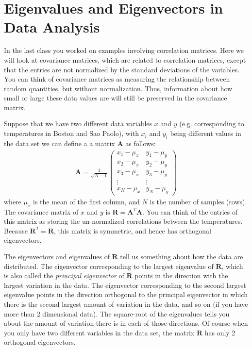 
\section{Eigenvalues and Eigenvectors in Data Analysis}

In the last class you worked on examples involving correlation matrices. Here we will look at covariance matrices, which are related to correlation matrices, except that the entries are not normalized by the standard deviations of the variables. You can think of covariance matrices as measuring the relationship between random quantities, but without normalization. Thus, information about how small or large these data values are will still be preserved in the covariance matrix.

Suppose that  we have two different data variables $x$ and $y$ (e.g. corresponding to temperatures in Boston and Sao Paolo), with $x_i$ and $y_i$ being different values in the data set we can define a a matrix $\mathbf{A}$ as follows:
\begin{align*}
\mathbf{A} = \frac{1}{\sqrt{N-1}} \begin{pmatrix}
    {x_1-\mu_x} & {y_1-\mu_y}\\
   {x_2-\mu_x} &  {y_2-\mu_y}\\
    {x_3-\mu_x} & {y_3-\mu_y}\\
    \vdots & \vdots \\
    x_N - \mu_x & y_N - \mu_y
  \end{pmatrix}
\end{align*}
where $\mu_x$ is the mean  of the first column, and $N$ is the number of samples (rows).  The covariance matrix of $x$ and $y$ is $\mathbf{R} = \mathbf{A}^T \mathbf{A}$. You can think of the entries of this matrix as storing the un-normalized correlations between the temperatures. Because $\mathbf{R}^T = \mathbf{R}$, this matrix is symmetric, and hence has orthogonal eigenvectors.

The eigenvectors and eigenvalues of $\mathbf{R}$ tell us something about how the data are distributed.  The eigenvector corresponding to the largest eigenvalue of $\mathbf{R}$, which is also called the \emph{principal eigenvector} of $\mathbf{R}$ points in the direction with the largest variation in the data. The eigenvector corresponding to the second largest eigenvalue points in the direction orthogonal to the principal eigenvector in which there is the second largest amount of variation in the data, and so on (if you have more than 2 dimensional data). The square-root of the eigenvalues tells you about the amount of variation there is in each of those directions. Of course when you only have two different variables in the data set, the matrix $\mathbf{R}$ has only 2 orthogonal eigenvectors.

